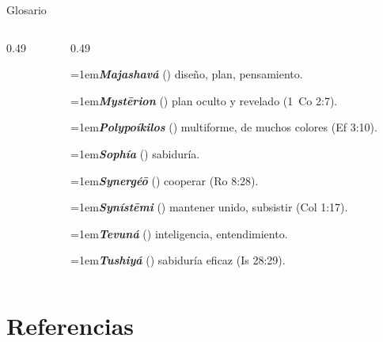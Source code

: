 \begin{frame}{Glosario}
\begin{columns}[t,onlytextwidth]
\begin{column}{0.49\textwidth}
\end{column}
\begin{column}{0.49\textwidth}

\par\noindent\hangindent=1em{\color{azul}\textbf{\emph{Majashavá}}} () diseño, plan, pensamiento.\par\vspace{2pt}
\par\noindent\hangindent=1em{\color{azul}\textbf{\emph{Mystērion}}} () plan oculto y revelado (1~Co 2:7).\par\vspace{2pt}
\par\noindent\hangindent=1em{\color{azul}\textbf{\emph{Polypoíkilos}}} () multiforme, de muchos colores (Ef 3:10).\par\vspace{2pt}
\par\noindent\hangindent=1em{\color{azul}\textbf{\emph{Sophía}}} () sabiduría.\par\vspace{2pt}
\par\noindent\hangindent=1em{\color{azul}\textbf{\emph{Synergéō}}} () cooperar (Ro 8:28).\par\vspace{2pt}
\par\noindent\hangindent=1em{\color{azul}\textbf{\emph{Synístēmi}}} () mantener unido, subsistir (Col 1:17).\par\vspace{2pt}
\par\noindent\hangindent=1em{\color{azul}\textbf{\emph{Tevuná}}} () inteligencia, entendimiento.\par\vspace{2pt}
\par\noindent\hangindent=1em{\color{azul}\textbf{\emph{Tushiyá}}} () sabiduría eficaz (Is 28:29).\par\vspace{2pt}

\end{column}
\end{columns}
\end{frame}

\section{Referencias}

